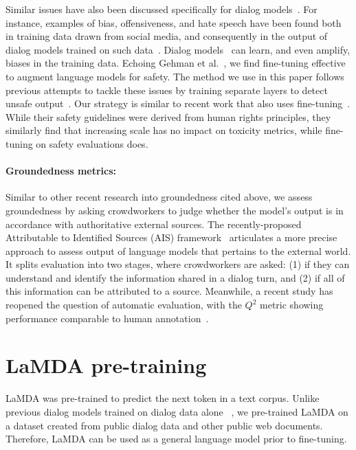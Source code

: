 \documentclass{article}
\begin{document}
Similar issues have also been discussed specifically for dialog models~\cite{dinan2021anticipating}. For instance, examples of bias, offensiveness, and hate speech have been found both in training data drawn from social media, and consequently in the output of dialog models trained on such data~\cite{henderson2018ethical}. Dialog models~\cite{dinan-etal-2020-queens} can learn, and even amplify, biases in the training data. Echoing Gehman et al.~\cite{gehman-etal-2020-realtoxicityprompts}, we find fine-tuning effective to augment language models for safety. The method we use in this paper follows previous attempts to tackle these issues by training separate layers to detect unsafe output~\cite{adiwardana2020humanlike,liu2019does,blenderbot,xu2020safetyrecipes}. Our strategy is similar to recent work that also uses fine-tuning~\cite{solaiman2021palms}. While their safety guidelines were derived from human rights principles, they similarly find that increasing scale has no impact on toxicity metrics, while fine-tuning on safety evaluations does.

\paragraph{Groundedness metrics:} Similar to other recent research into groundedness cited above, we assess groundedness by asking crowdworkers to judge whether the model’s output is in accordance with authoritative external sources. The recently-proposed Attributable to Identified Sources (AIS) framework~\cite{rashkin2021measuring} articulates a more precise approach to assess output of language models that pertains to the external world. It splits evaluation into two stages, where crowdworkers are asked: (1) if they can understand and identify the information shared in a dialog turn, and (2) if all of this information can be attributed to a source. Meanwhile, a recent study has reopened the question of automatic evaluation, with the $Q^2$ metric showing performance comparable to human annotation~\cite{honovich2021q2}.

\section{LaMDA pre-training}
\label{sec:pretraining}

LaMDA was pre-trained to predict the next token in a text corpus. Unlike previous dialog models trained on dialog data alone ~\cite{adiwardana2020humanlike,blenderbot}, we pre-trained LaMDA on a dataset created from public dialog data and other public web documents. Therefore, LaMDA can be used as a general language model prior to fine-tuning.
\end{document}
